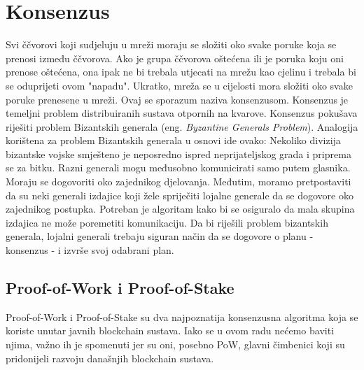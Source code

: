 \documentclass[times, utf8, diplomski]{fer}
\begin{document}
\section{Konsenzus}
Svi ččvorovi koji sudjeluju u mreži moraju se složiti oko svake poruke koja se prenosi između ččvorova. Ako je grupa ččvorova oštećena ili je poruka koju oni prenose oštećena, ona ipak ne bi trebala utjecati na mrežu kao cjelinu i trebala bi se oduprijeti ovom "napadu". Ukratko, mreža se u cijelosti mora složiti oko svake poruke prenesene u mreži. Ovaj se sporazum naziva konsenzusom. Konsenzus je temeljni problem distribuiranih sustava otpornih na kvarove. Konsenzus pokušava riješiti problem Bizantskih generala
(eng.  \textit{Byzantine Generals Problem}). Analogija korištena za problem Bizantskih generala u osnovi ide ovako: Nekoliko divizija bizantske vojske smješteno je neposredno ispred neprijateljskog grada i priprema se za bitku. Razni generali mogu međusobno komunicirati samo putem glasnika. Moraju se dogovoriti oko zajednikog djelovanja. Međutim, moramo pretpostaviti da su neki generali izdajice koji žele spriječiti lojalne generale da se dogovore oko zajednikog postupka. Potreban je algoritam kako bi se osiguralo da mala skupina izdajica ne može poremetiti komunikaciju. Da bi riješili problem bizantskih generala, lojalni generali trebaju siguran način da se dogovore o planu - konsenzus - i izvrše svoj odabrani plan.

\subsection{Proof-of-Work i Proof-of-Stake}
Proof-of-Work i Proof-of-Stake su dva najpoznatija konsenzusna algoritma koja se koriste unutar javnih blockchain sustava. Iako se u ovom radu nećemo baviti njima, važno ih je spomenuti jer su oni, posebno PoW, glavni čimbenici koji su pridonijeli razvoju današnjih blockchain sustava.
\end{document}
